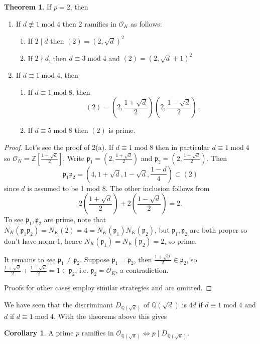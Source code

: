 \documentclass{article}
\newcommand{\Z}{\mathbb{Z}}
\newcommand{\Q}{\mathbb{Q}}
\newcommand{\Mod}{\operatorname{mod}}
\newcommand{\ri}{\mathcal{O}}
\newcommand{\ip}{\mathfrak{p}}
\theoremstyle{definition}
\newtheorem{thm}[defn]{Theorem}
\newtheorem{coro}[defn]{Corollary}
\begin{document}
\begin{thm}
\label{thm:quadrampis2}
If $p=2$, then
\begin{enumerate}
\item If $d\not\equiv 1\Mod 4$ then 2 ramifies in $\ri_K$ as follows:
\begin{enumerate}
\item If $2\mid d$ then $(2)=\left(2,\sqrt{d}\right)^2$
\item If $2\nmid d$, then $d\equiv 3\Mod 4$ and $(2)=\left(2,\sqrt{d}+1\right)^2$
\end{enumerate}
\item If $d\equiv 1\Mod 4$, then
\begin{enumerate}
\item If $d\equiv 1\Mod 8$, then
\[
(2)=\left(2,\frac{1+\sqrt d}{2}\right)\left(2,\frac{1-\sqrt d}{2}\right).
\]
\item If $d\equiv 5\Mod 8$ then $(2)$ is prime.
\end{enumerate}
\end{enumerate}
\end{thm}
\begin{proof}
Let's see the proof of 2(a). If $d\equiv 1\Mod 8$ then in particular $d\equiv 1\Mod 4$ so $\ri_K=\Z\left[\frac{1+\sqrt d}{2}\right]$. Write $\ip_1=\left(2,\frac{1+\sqrt d}{2}\right)$ and $\ip_2=\left(2,\frac{1-\sqrt d}{2}\right)$. Then
\[
\ip_1\ip_2=\left(4,1+\sqrt d,1-\sqrt d,\frac{1-d}{4}\right)\subset (2)
\]
since $d$ is assumed to be 1 mod 8. The other inclusion follows from
\[
2\left(\frac{1+\sqrt d}{2}\right)+2\left(\frac{1-\sqrt d}{2}\right)=2.
\]
To see $\ip_1,\ip_2$ are prime, note that $N_K(\ip_1\ip_2)=N_K(2)=4=N_K(\ip_1)N_K(\ip_2)$, but $\ip_1,\ip_2$ are both proper so don't have norm 1, hence $N_K(\ip_1)=N_K(\ip_2)=2$, so prime.

It remains to see $\ip_1\neq\ip_2$. Suppose $\ip_1=\ip_2$, then $\frac{1+\sqrt d}{2}\in\ip_2$, so $\frac{1+\sqrt d}{2}+\frac{1-\sqrt d}{2}=1\in\ip_2$, i.e. $\ip_2=\ri_K$, a contradiction.

Proofs for other cases employ similar strategies and are omitted.
\end{proof}

We have seen that the discriminant $D_{\Q\left(\sqrt d\right)}$ of $\Q\left(\sqrt d\right)$ is $4d$ if $d\equiv 1\Mod 4$ and $d$ if $d\equiv 1\Mod 4$. With the theorems above this gives

\begin{coro}
A prime $p$ ramifies in $\ri_{\Q\left(\sqrt d\right)}\iff p\mid D_{\Q\left(\sqrt d\right)}$.
\end{coro}
\end{document}
